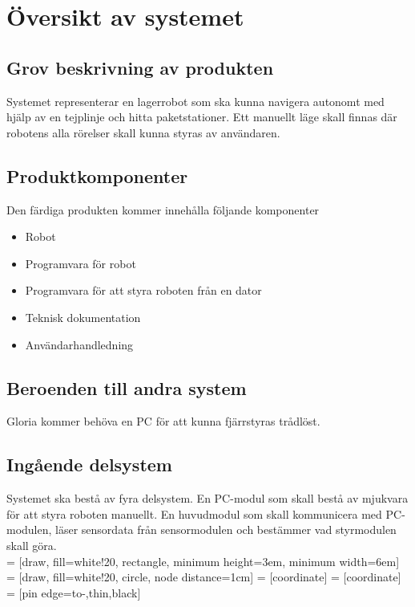 \section{Översikt av systemet}

\subsection{Grov beskrivning av produkten}
Systemet representerar en lagerrobot som ska kunna navigera autonomt med hjälp av en tejplinje och hitta paketstationer. Ett manuellt läge skall finnas där robotens alla rörelser skall kunna styras av användaren.

\subsection{Produktkomponenter}
Den färdiga produkten kommer innehålla följande komponenter
\begin{itemize}
\item{Robot}
\item{Programvara för robot}
\item{Programvara för att styra roboten från en dator}
\item{Teknisk dokumentation}
\item{Användarhandledning}
\end{itemize}

\subsection{Beroenden till andra system}
Gloria kommer behöva en PC för att kunna fjärrstyras trådlöst.

\subsection{Ingående delsystem}
Systemet ska bestå av fyra delsystem. En PC-modul som skall bestå av mjukvara för att styra roboten manuellt. En huvudmodul som skall kommunicera med PC-modulen, läser sensordata från sensormodulen och bestämmer vad styrmodulen skall göra. \\

 = [draw, fill=white!20, rectangle,
    minimum height=3em, minimum width=6em]
 = [draw, fill=white!20, circle, node distance=1cm]
 = [coordinate]
 = [coordinate]
 = [pin edge={to-,thin,black}]

\begin{center}
\end{center}

